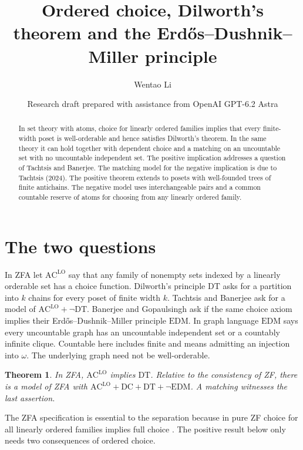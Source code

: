 \documentclass[11pt]{article}
\title{Ordered choice, Dilworth's theorem and the Erdős--Dushnik--Miller principle}
\author{Wentao Li}
\date{Research draft prepared with assistance from OpenAI GPT-6.2 Astra}
\newtheorem{theorem}{Theorem}
\begin{document}
\maketitle
\begin{abstract}
In set theory with atoms, choice for linearly ordered families implies that every finite-width poset is well-orderable and hence satisfies Dilworth's theorem. In the same theory it can hold together with dependent choice and a matching on an uncountable set with no uncountable independent set. The positive implication addresses a question of Tachtsis and Banerjee. The matching model for the negative implication is due to Tachtsis (2024). The positive theorem extends to posets with well-founded trees of finite antichains. The negative model uses interchangeable pairs and a common countable reserve of atoms for choosing from any linearly ordered family.
\end{abstract}

\section{The two questions}
In ZFA let $\mathrm{AC}^{\mathrm{LO}}$ say that any family of nonempty sets indexed by a linearly orderable set has a choice function. Dilworth's principle $\mathrm{DT}$ asks for a partition into $k$ chains for every poset of finite width $k$. Tachtsis \cite{tac} and Banerjee \cite[Question 6.5]{ban} ask for a model of $\mathrm{AC}^{\mathrm{LO}}+\neg\mathrm{DT}$. Banerjee and Gopaulsingh \cite[Question 6.4]{edm} ask if the same choice axiom implies their Erdős--Dushnik--Miller principle $\mathrm{EDM}$. In graph language $\mathrm{EDM}$ says every uncountable graph has an uncountable independent set or a countably infinite clique. Countable here includes finite and means admitting an injection into $\omega$. The underlying graph need not be well-orderable.

\begin{theorem}\label{main}
In ZFA, $\mathrm{AC}^{\mathrm{LO}}$ implies $\mathrm{DT}$. Relative to the consistency of ZF, there is a model of ZFA with $\mathrm{AC}^{\mathrm{LO}}+\mathrm{DC}+\mathrm{DT}+\neg\mathrm{EDM}$. A matching witnesses the last assertion.
\end{theorem}
The ZFA specification is essential to the separation because in pure ZF choice for all linearly ordered families implies full choice \cite{hr}. The positive result below only needs two consequences of ordered choice.
\end{document}
